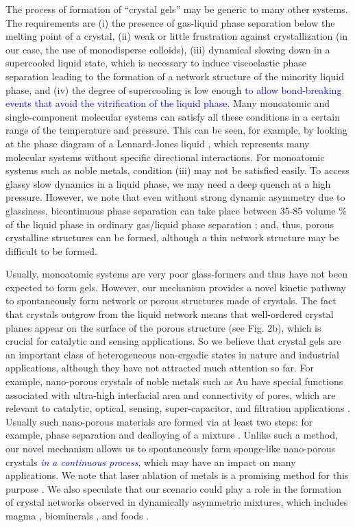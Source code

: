 \documentclass[preprint,amsmath,amssymb,superscriptaddress]{revtex4-1}
\begin{document}
The process of formation of ``crystal gels'' may be generic to many other 
systems. The requirements are (i) the presence of gas-liquid phase separation below the melting point of a crystal, (ii) 
weak or little frustration against crystallization (in our case, the use of monodisperse colloids), 
(iii) dynamical slowing down in a supercooled liquid state, which is necessary to induce viscoelastic phase separation leading to the formation 
of a network structure of the minority liquid phase, and (iv) the degree of supercooling is low enough
\textcolor{blue}{to allow bond-breaking events that avoid the vitrification of the liquid phase.}
Many monoatomic and single-component molecular systems can satisfy all these conditions in a certain range of the temperature and pressure. 
This can be seen, for example, by looking at the phase diagram of a Lennard-Jones liquid \cite{lodge1997brownian}, which represents many molecular systems 
without specific directional interactions. For monoatomic systems such as noble metals, condition (iii) may not be satisfied easily. 
To access glassy slow dynamics in a liquid phase, we may need a deep quench at a high pressure. However, we note that even without strong dynamic asymmetry 
due to glassiness, bicontinuous phase separation can take place between 35-85 volume \% of the liquid phase in ordinary gas/liquid phase separation \cite{Onuki2002}; 
and, thus, porous crystalline structures can be formed, although a thin network structure may be difficult to be formed.

Usually, monoatomic systems are very poor glass-formers and thus have not been expected to form gels. 
However, our mechanism provides a novel kinetic pathway to spontaneously form network or porous structures made of crystals.  The fact that crystals outgrow from the liquid network means that well-ordered crystal planes appear on the surface of the porous structure (see Fig. 2b), which is crucial for catalytic and sensing applications. So we believe that crystal gels are an important class of heterogeneous non-ergodic states in nature 
and industrial applications, although they have not attracted much attention so far.  
For example, nano-porous crystals of noble metals such as Au have special functions associated with ultra-high interfacial area and connectivity of pores, which are relevant to catalytic, optical, sensing, super-capacitor, and filtration applications 
\cite{ding2004nanoporous, ding2009nanoporous, wittstock2010nanoporous,fujita2012atomic}. Usually such nano-porous materials are formed via at least two steps: for example, phase separation and dealloying of a mixture
\cite{erlebacher2001evolution}. Unlike such a method, our novel mechanism allows us to spontaneously form sponge-like nano-porous crystals \textcolor{blue}{\emph{in a continuous process}}, 
which may have an impact on many applications. 
We note that laser ablation of metals is a promising method for this purpose \cite{povarnitsyn2013mechanisms}.
We also speculate that our scenario could play a role in the formation of crystal networks observed in dynamically asymmetric mixtures, 
which includes magma \cite{philpotts1998role}, biominerals \cite{rousseau2005multiscale}, and foods \cite{deman1987fat}. 
\end{document}
